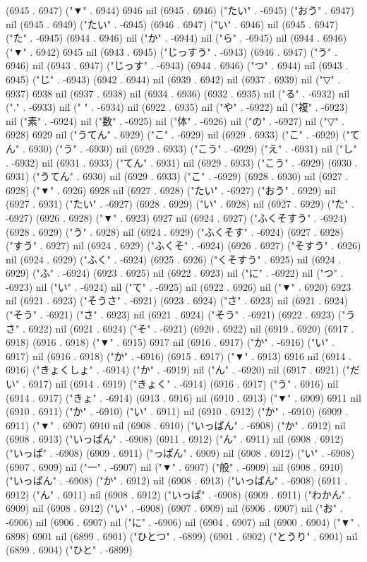 (6945 . 6947) ("▼" . 6944) 6946 nil (6945 . 6946) ("たい" . -6945) ("おう" . 6947) nil (6945 . 6949) ("たい" . -6945) (6946 . 6947) ("い" . 6946) nil (6945 . 6947) ("た" . -6945) (6944 . 6946) nil ("か" . -6944) nil ("ら" . -6945) nil (6944 . 6946) ("▼" . 6942) 6945 nil (6943 . 6945) ("じっすう" . -6943) (6946 . 6947) ("う" . 6946) nil (6943 . 6947) ("じっす" . -6943) (6944 . 6946) ("つ" . 6944) nil (6943 . 6945) ("じ" . -6943) (6942 . 6944) nil (6939 . 6942) nil (6937 . 6939) nil ("▽" . 6937) 6938 nil (6937 . 6938) nil (6934 . 6936) (6932 . 6935) nil ("る" . -6932) nil ("." . -6933) nil (" " . -6934) nil (6922 . 6935) nil ("や" . -6922) nil ("複" . -6923) nil ("素" . -6924) nil ("数" . -6925) nil ("体" . -6926) nil ("の" . -6927) nil ("▽" . 6928) 6929 nil ("うてん" . 6929) ("こ" . -6929) nil (6929 . 6933) ("こ" . -6929) ("てん" . 6930) ("う" . -6930) nil (6929 . 6933) ("こう" . -6929) ("え" . -6931) nil ("し" . -6932) nil (6931 . 6933) ("てん" . 6931) nil (6929 . 6933) ("こう" . -6929) (6930 . 6931) ("うてん" . 6930) nil (6929 . 6933) ("こ" . -6929) (6928 . 6930) nil (6927 . 6928) ("▼" . 6926) 6928 nil (6927 . 6928) ("たい" . -6927) ("おう" . 6929) nil (6927 . 6931) ("たい" . -6927) (6928 . 6929) ("い" . 6928) nil (6927 . 6929) ("た" . -6927) (6926 . 6928) ("▼" . 6923) 6927 nil (6924 . 6927) ("ふくそすう" . -6924) (6928 . 6929) ("う" . 6928) nil (6924 . 6929) ("ふくそす" . -6924) (6927 . 6928) ("すう" . 6927) nil (6924 . 6929) ("ふくそ" . -6924) (6926 . 6927) ("そすう" . 6926) nil (6924 . 6929) ("ふく" . -6924) (6925 . 6926) ("くそすう" . 6925) nil (6924 . 6929) ("ふ" . -6924) (6923 . 6925) nil (6922 . 6923) nil ("に" . -6922) nil ("つ" . -6923) nil ("い" . -6924) nil ("て" . -6925) nil (6922 . 6926) nil ("▼" . 6920) 6923 nil (6921 . 6923) ("そうさ" . -6921) (6923 . 6924) ("さ" . 6923) nil (6921 . 6924) ("そう" . -6921) ("さ" . 6923) nil (6921 . 6924) ("そう" . -6921) (6922 . 6923) ("うさ" . 6922) nil (6921 . 6924) ("そ" . -6921) (6920 . 6922) nil (6919 . 6920) (6917 . 6918) (6916 . 6918) ("▼" . 6915) 6917 nil (6916 . 6917) ("か" . -6916) ("い" . 6917) nil (6916 . 6918) ("か" . -6916) (6915 . 6917) ("▼" . 6913) 6916 nil (6914 . 6916) ("きょくしょ" . -6914) ("か" . -6919) nil ("ん" . -6920) nil (6917 . 6921) ("だい" . 6917) nil (6914 . 6919) ("きょく" . -6914) (6916 . 6917) ("う" . 6916) nil (6914 . 6917) ("きょ" . -6914) (6913 . 6916) nil (6910 . 6913) ("▼" . 6909) 6911 nil (6910 . 6911) ("か" . -6910) ("い" . 6911) nil (6910 . 6912) ("か" . -6910) (6909 . 6911) ("▼" . 6907) 6910 nil (6908 . 6910) ("いっぱん" . -6908) ("か" . 6912) nil (6908 . 6913) ("いっぱん" . -6908) (6911 . 6912) ("ん" . 6911) nil (6908 . 6912) ("いっぱ" . -6908) (6909 . 6911) ("っぱん" . 6909) nil (6908 . 6912) ("い" . -6908) (6907 . 6909) nil ("一" . -6907) nil ("▼" . 6907) ("般" . -6909) nil (6908 . 6910) ("いっぱん" . -6908) ("か" . 6912) nil (6908 . 6913) ("いっぱん" . -6908) (6911 . 6912) ("ん" . 6911) nil (6908 . 6912) ("いっぱ" . -6908) (6909 . 6911) ("わかん" . 6909) nil (6908 . 6912) ("い" . -6908) (6907 . 6909) nil (6906 . 6907) nil ("お" . -6906) nil (6906 . 6907) nil ("に" . -6906) nil (6904 . 6907) nil (6900 . 6904) ("▼" . 6898) 6901 nil (6899 . 6901) ("ひとつ" . -6899) (6901 . 6902) ("とうり" . 6901) nil (6899 . 6904) ("ひと" . -6899) 